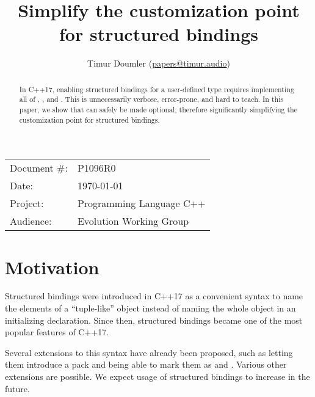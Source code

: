 



\title{Simplify the customization point for structured bindings}
\author{
Timur Doumler \small(\href{mailto:papers@timur.audio}{papers@timur.audio})}
\date{} %
\maketitle

\begin{tabular}{ll}
Document \#: & P1096R0 \\
Date: &\today \\
Project: & Programming Language C++ \\
Audience: & Evolution Working Group
\end{tabular}

\vspace{10mm}
\begin{abstract}
In C++17, enabling structured bindings for a user-defined type requires implementing all of , , and . This is unnecessarily verbose, error-prone, and hard to teach. In this paper, we show that  can safely be made optional, therefore significantly simplifying the customization point for structured bindings. 
\end{abstract}

\vspace{10mm}
\section{Motivation}
\label{sec:motivation}

Structured bindings were introduced in C++17 as a convenient syntax to name the elements of a ``tuple-like'' object instead of naming the whole object in an initializing declaration. Since then, structured bindings became one of the most popular features of C++17. 

Several extensions to this syntax have already been proposed, such as letting them introduce a pack \cite{P1061R0} and being able to mark them as  and  \cite{P1091R0}. Various other extensions are possible. We expect usage of structured bindings to increase in the future.

